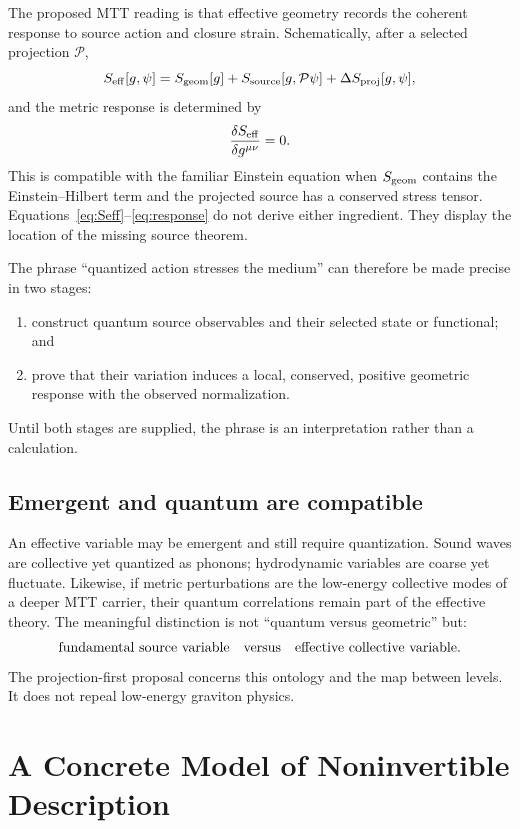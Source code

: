 \documentclass[11pt]{article}
\newcommand{\cP}{\mathcal P}
\begin{document}
The proposed MTT reading is that effective geometry records the coherent
response to source action and closure strain.  Schematically, after a selected
projection \(\cP\),
\begin{equation}
 S_{\rm eff}[g,\psi]
 =S_{\rm geom}[g]+S_{\rm source}[g,\cP\psi]
 +\Delta S_{\rm proj}[g,\psi],
\label{eq:Seff}
\end{equation}
and the metric response is determined by
\begin{equation}
 \frac{\delta S_{\rm eff}}{\delta g^{\mu\nu}}=0.
\label{eq:response}
\end{equation}
This is compatible with the familiar Einstein equation when
\(S_{\rm geom}\) contains the Einstein--Hilbert term and the projected source
has a conserved stress tensor.  Equations~\eqref{eq:Seff}--\eqref{eq:response}
do not derive either ingredient.  They display the location of the missing
source theorem.

The phrase ``quantized action stresses the medium'' can therefore be made
precise in two stages:
\begin{enumerate}
\item construct quantum source observables and their selected state or
functional; and
\item prove that their variation induces a local, conserved, positive
geometric response with the observed normalization.
\end{enumerate}
Until both stages are supplied, the phrase is an interpretation rather than a
calculation.

\subsection{Emergent and quantum are compatible}

An effective variable may be emergent and still require quantization.  Sound
waves are collective yet quantized as phonons; hydrodynamic variables are
coarse yet fluctuate.  Likewise, if metric perturbations are the low-energy
collective modes of a deeper MTT carrier, their quantum correlations remain
part of the effective theory.  The meaningful distinction is not
``quantum versus geometric'' but:
\[
\text{fundamental source variable}
\quad\hbox{versus}\quad
\text{effective collective variable}.
\]
The projection-first proposal concerns this ontology and the map between
levels.  It does not repeal low-energy graviton physics.

\section{A Concrete Model of Noninvertible Description}
\end{document}
